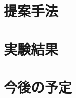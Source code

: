 \documentclass[uplatex,a4paper,10pt]{jsarticle}
\begin{document}
\subsection{}


\section{提案手法}

\subsection{}

\subsection{}

\subsection{}

\section{実験結果}
\subsection{}


\subsection{}


\section{今後の予定}

\newpage
\newpage 
\end{document}
